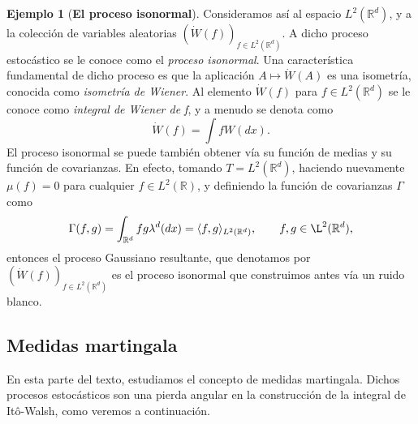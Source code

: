 \documentclass[letterpaper,twoside]{book}
\newcommand{\R}{\mathbb{R}}
\newcommand{\W}{\dot{W}}
\newcommand{\1}{\mathds{1}}
\theoremstyle{definition}
\theoremstyle{definition}
\theoremstyle{definition}
\theoremstyle{definition}
\theoremstyle{definition}
\theoremstyle{definition}
\newtheorem{ejem}{Ejemplo}
\theoremstyle{definition}
\begin{document}
\begin{ejem}[\textbf{El proceso isonormal}]
Consideramos así al espacio $L^{2}(\R^{d})$, y a la colección de variables aleatorias $(\W(f))_{f\in L^{2}(\R^{d})}$. A dicho proceso estocástico se le conoce como el \textit{proceso isonormal}. Una característica fundamental de dicho proceso es que la aplicación $A\mapsto\W(A)$ es una isometría, conocida como \textit{isometría de Wiener}. Al elemento $\W(f)$ para $f\in L^2(\R^{d})$ se le conoce como \textit{integral de Wiener de f}, y a menudo se denota como
\[
\W(f)=\int f W(dx).    
\] 
El proceso isonormal se puede también obtener vía su función de medias y su función de covarianzas. En efecto, tomando $T=L^{2}(\R^{d})$, haciendo nuevamente $\mu(f)=0$ para cualquier $f\in L^2(\R)$, y definiendo la función de covarianzas $\Gamma$ como
\[
\Gamma(f,g)=\int_{\R^d}fg \lambda^d(dx)=\langle f,g\rangle_{L^{2}(\R^{d})}, \qquad f,g\in \L^2(\R^{d}),
\]
entonces el proceso Gaussiano resultante, que denotamos por $(\W(f))_{f\in L^{2}(\R^{d})}$ es el proceso isonormal que construimos antes vía un ruido blanco. 
 \end{ejem}

\subsection{Medidas martingala}

En esta parte del texto, estudiamos el concepto de medidas martingala. Dichos procesos estocásticos son una pierda angular en la construcción de la integral de Itô-Walsh, como veremos a continuación.
\end{document}
